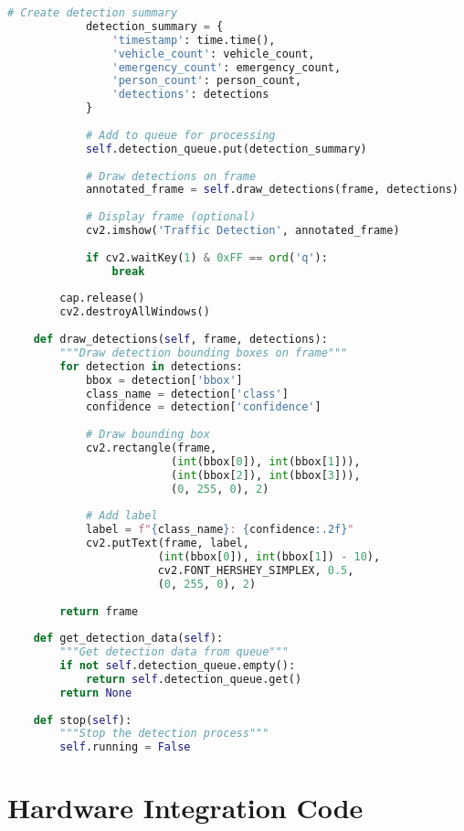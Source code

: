 \begin{lstlisting}[language=Python, caption=Real-time Object Detection]
            # Create detection summary
            detection_summary = {
                'timestamp': time.time(),
                'vehicle_count': vehicle_count,
                'emergency_count': emergency_count,
                'person_count': person_count,
                'detections': detections
            }
            
            # Add to queue for processing
            self.detection_queue.put(detection_summary)
            
            # Draw detections on frame
            annotated_frame = self.draw_detections(frame, detections)
            
            # Display frame (optional)
            cv2.imshow('Traffic Detection', annotated_frame)
            
            if cv2.waitKey(1) & 0xFF == ord('q'):
                break
        
        cap.release()
        cv2.destroyAllWindows()
    
    def draw_detections(self, frame, detections):
        """Draw detection bounding boxes on frame"""
        for detection in detections:
            bbox = detection['bbox']
            class_name = detection['class']
            confidence = detection['confidence']
            
            # Draw bounding box
            cv2.rectangle(frame, 
                         (int(bbox[0]), int(bbox[1])), 
                         (int(bbox[2]), int(bbox[3])), 
                         (0, 255, 0), 2)
            
            # Add label
            label = f"{class_name}: {confidence:.2f}"
            cv2.putText(frame, label, 
                       (int(bbox[0]), int(bbox[1]) - 10),
                       cv2.FONT_HERSHEY_SIMPLEX, 0.5, 
                       (0, 255, 0), 2)
        
        return frame
    
    def get_detection_data(self):
        """Get detection data from queue"""
        if not self.detection_queue.empty():
            return self.detection_queue.get()
        return None
    
    def stop(self):
        """Stop the detection process"""
        self.running = False
\end{lstlisting}

\section{Hardware Integration Code}
\label{app:hardware_integration}

